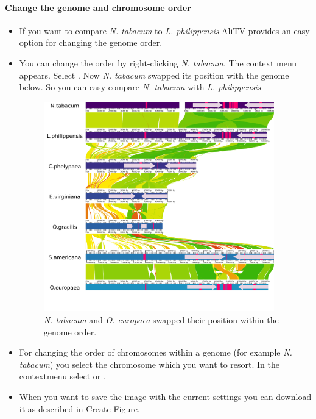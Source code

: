 \documentclass[a4paper]{scrartcl}
\begin{document}
\paragraph*{Change the genome and chromosome order}	
\begin{itemize}
\item If you want to compare \emph{N. tabacum} to \emph{L. philippensis} AliTV provides an easy option  for changing the genome order.
\item You can change the order by right-clicking \emph{N. tabacum}. The context menu appears. Select . Now \emph{N. tabacum} swapped its position with the genome below. So you can easy compare \emph{N. tabacum} with \emph{L. philippensis}

	\begin{figure}[H]
		\centering
		\includegraphics[width=10cm]{swap1.png}
		\caption{\emph{N. tabacum} and \emph{O. europaea} swapped their position within the genome order.}
	\end{figure}
	\item For changing the order of chromosomes within a genome (for example \emph{N. tabacum}) you select the chromosome which you want to resort. In the contextmenu select  or .
	\item When you want to save the image with the current settings you can download it as described in Create Figure.
\end{itemize}
\end{document}
